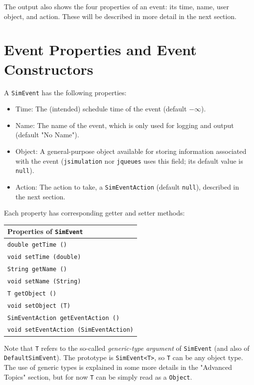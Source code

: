 \documentclass[12pt]{book}
\begin{document}
The output also shows the four properties of an event: its time, name, user object, and action.
These will be described in more detail in the next section.

\section{Event Properties and Event Constructors}

A \lstinline{SimEvent} has the following properties:
\begin{itemize}
\item Time:   The (intended) schedule time of the event (default $-\infty$).
\item Name:   The name of the event, which is only used for logging and output (default "No Name").
\item Object: A general-purpose object available for storing information associated with the event
              (\lstinline{jsimulation} nor \lstinline{jqueues} uses this field; its
              default value is \lstinline{null}).
\item Action: The action to take, a \lstinline{SimEventAction} (default \lstinline{null}),
                described in the next section.
\end{itemize}
Each property has corresponding getter and setter methods:

\begin{tabular}{|l|}
  \hline
  {\bf Properties of \lstinline|SimEvent|} \\
  \hline
  \lstinline[basicstyle=\footnotesize]!double getTime ()! \\
  \lstinline[basicstyle=\footnotesize]!void setTime (double)! \\
  \hline
  \lstinline[basicstyle=\footnotesize]!String getName ()! \\
  \lstinline[basicstyle=\footnotesize]!void setName (String)! \\
  \hline
  \lstinline[basicstyle=\footnotesize]!T getObject ()! \\
  \lstinline[basicstyle=\footnotesize]!void setObject (T)! \\
  \hline
  \lstinline[basicstyle=\footnotesize]!SimEventAction getEventAction ()! \\
  \lstinline[basicstyle=\footnotesize]!void setEventAction (SimEventAction)! \\
  \hline
\end{tabular}

Note that \lstinline{T} refers to the so-called {\em generic-type argument\/}
  of \lstinline{SimEvent} (and also of \lstinline|DefaultSimEvent|).
The prototype is \lstinline|SimEvent<T>|, so \lstinline|T| can be any object type.
The use of generic types is explained in some more details in the "Advanced Topics" section,
  but for now \lstinline!T! can be simply read as a \lstinline{Object}.
\end{document}
